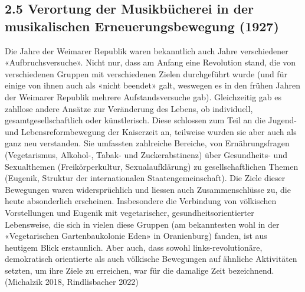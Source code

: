 \documentclass[a4paper,
fontsize=11pt,
oneside,
numbers=noperiodatend,
parskip=half-,
bibliography=totoc,
final
]{scrartcl}
\begin{document}
\hypertarget{verortung-der-musikbuxfccherei-in-der-musikalischen-erneuerungsbewegung-1927}{%
\subsection{2.5 Verortung der Musikbücherei in der musikalischen
Erneuerungsbewegung
(1927)}\label{verortung-der-musikbuxfccherei-in-der-musikalischen-erneuerungsbewegung-1927}}

Die Jahre der Weimarer Republik waren bekanntlich auch Jahre
verschiedener «Aufbruchsversuche». Nicht nur, dass am Anfang eine
Revolution stand, die von verschiedenen Gruppen mit verschiedenen Zielen
durchgeführt wurde (und für einige von ihnen auch als «nicht beendet»
galt, weswegen es in den frühen Jahren der Weimarer Republik mehrere
Aufstandsversuche gab). Gleichzeitig gab es zahllose andere Ansätze zur
Veränderung des Lebens, ob individuell, gesamtgesellschaftlich oder
künstlerisch. Diese schlossen zum Teil an die Jugend- und
Lebensreformbewegung der Kaiserzeit an, teilweise wurden sie aber auch
als ganz neu verstanden. Sie umfassten zahlreiche Bereiche, von
Ernährungsfragen (Vegetarismus, Alkohol-, Tabak- und Zuckerabstinenz)
über Gesundheits- und Sexualthemen (Freikörperkultur, Sexualaufklärung)
zu gesellschaftlichen Themen (Eugenik, Struktur der internationalen
Staatengemeinschaft). Die Ziele dieser Bewegungen waren widersprüchlich
und liessen auch Zusammenschlüsse zu, die heute absonderlich erscheinen.
Insbesondere die Verbindung von völkischen Vorstellungen und Eugenik mit
vegetarischer, gesundheitsorientierter Lebensweise, die sich in vielen
diese Gruppen (am bekanntesten wohl in der «Vegetarischen
Gartenbaukolonie Eden» in Oranienburg) fanden, ist aus heutigem Blick
erstaunlich. Aber auch, dass sowohl links-revolutionäre, demokratisch
orientierte als auch völkische Bewegungen auf ähnliche Aktivitäten
setzten, um ihre Ziele zu erreichen, war für die damalige Zeit
bezeichnend. (Michalzik 2018, Rindlisbacher 2022)
\end{document}
